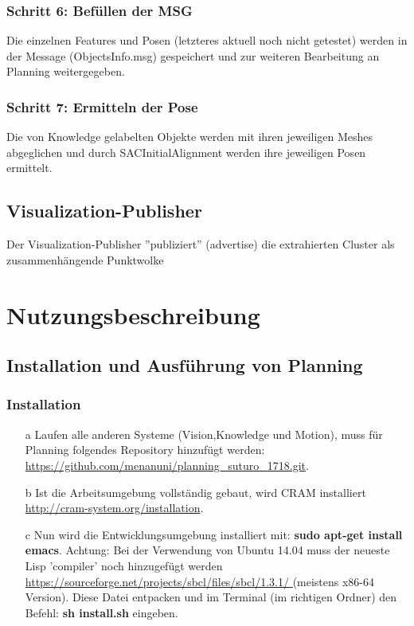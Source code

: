 \documentclass{suturo}
\begin{document}
\subsubsection{Schritt 6: Befüllen der MSG}
Die einzelnen Features und Posen (letzteres aktuell noch nicht getestet) werden in der Message (ObjectsInfo.msg) gespeichert und zur weiteren Bearbeitung an Planning weitergegeben.

\subsubsection{Schritt 7: Ermitteln der Pose}
Die von Knowledge gelabelten Objekte werden mit ihren jeweiligen Meshes abgeglichen und durch SACInitialAlignment werden ihre jeweiligen Posen ermittelt.

\subsection*{Visualization-Publisher}
Der Visualization-Publisher ''publiziert'' (advertise) die extrahierten Cluster als zusammenhängende Punktwolke

\newpage
\section{Nutzungsbeschreibung}

\subsection{Installation und Ausführung von Planning}

\subsubsection{Installation}
\begin{itemize}


\item[a] Laufen alle anderen Systeme (Vision,Knowledge und Motion), muss für Planning folgendes Repository hinzufügt werden: \url{https://github.com/menanuni/planning_suturo_1718.git}. 

\item[b] Ist die Arbeitsumgebung vollständig gebaut, wird CRAM installiert \url{http://cram-system.org/installation}.

\item[c] Nun wird die Entwicklungsumgebung installiert mit: \textbf{sudo apt-get install emacs}. Achtung: Bei der Verwendung von Ubuntu 14.04 muss der neueste Lisp 'compiler' noch hinzugefügt werden \url{https://sourceforge.net/projects/sbcl/files/sbcl/1.3.1/
} (meistens x86-64 Version). Diese Datei entpacken und im Terminal (im richtigen Ordner) den Befehl: \textbf{sh install.sh} eingeben.
\end{itemize}
\end{document}
